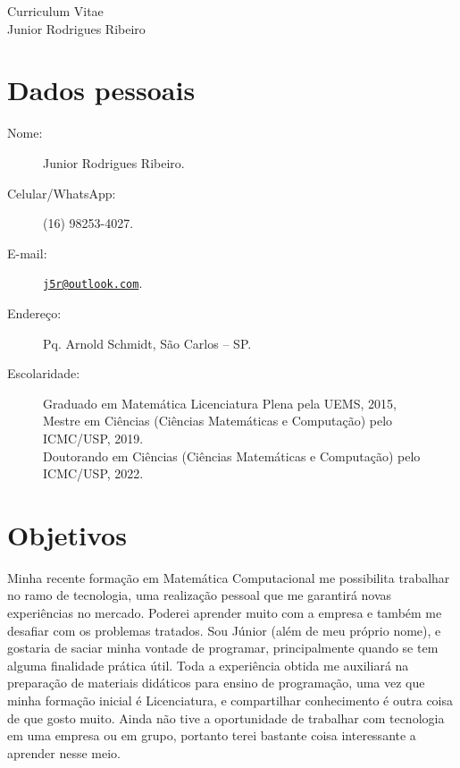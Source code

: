 \documentclass[11pt]{article}
\begin{document}
\begin{center}
\huge \sc Curriculum Vitae\\
\Large \sc Junior Rodrigues Ribeiro
\end{center}

\begin{flushright}
\end{flushright}
\vspace*{-4.4cm}

\section{Dados pessoais\dotfill\dotfill\dotfill \hfill \ }
\begin{description}
\item[Nome:] Junior Rodrigues Ribeiro.
\item[Celular/WhatsApp:] (16) 98253-4027.
\item[E-mail:] \href{mailto:j5r@outlook.com}{\nolinkurl{j5r@outlook.com}}.
\item[Endereço:] Pq. Arnold Schmidt, São Carlos -- SP.
\item[Escolaridade:] Graduado em Matemática Licenciatura Plena pela UEMS, 2015,\\
\phantom{Escolarid} Mestre em Ciências (Ciências Matemáticas e Computação) pelo ICMC/USP, 2019.\\
\phantom{Escolarid} Doutorando em Ciências (Ciências Matemáticas e Computação) pelo ICMC/USP, 2022.
\end{description}

\section{Objetivos \dotfill}
Minha recente formação em Matemática Computacional me possibilita trabalhar no ramo de tecnologia, uma realização pessoal  que me garantirá novas experiências no mercado. Poderei aprender muito com a empresa e também me desafiar com os problemas tratados. Sou Júnior (além de meu próprio nome), e gostaria de saciar minha vontade de programar,  principalmente quando se tem alguma finalidade prática útil. Toda a experiência obtida me auxiliará na preparação de materiais didáticos para ensino de programação, uma vez que minha formação inicial é Licenciatura, e compartilhar conhecimento é outra coisa de que gosto muito. Ainda não tive a oportunidade de trabalhar com tecnologia em uma empresa ou em grupo, portanto terei bastante coisa interessante a aprender nesse meio.
 
\end{document}
